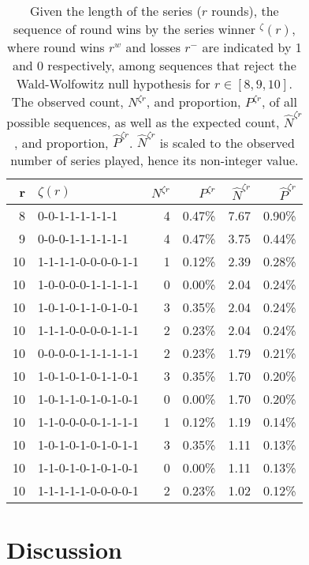 \documentclass{article}
\begin{document}
\begin{longtable}{rlrrrr}

\caption{Given the length of the series ($r$ rounds), the sequence of round wins by the series winner $^\zeta(r)$, where round wins $r^w$ and losses $r^-$ are indicated by 1 and 0 respectively, among sequences that reject the Wald-Wolfowitz null hypothesis for $r \in [8, 9, 10]$. The observed count, $N^{\zeta r}$, and proportion, $P^{\zeta r}$, of all possible sequences, as well as the expected count, $\hat{N}^{\zeta r}$, and proportion, $\hat{P}^{\zeta r}$. $\hat{N}^{\zeta r}$ is scaled to the observed number of series played, hence its non-integer value.}
\label{tbl:cod-runs} \\

\toprule
r & $\zeta(r)$ & $N^{\zeta r}$ & $P^{\zeta r}$ & $\hat{N}^{\zeta r}$ & $\hat{P}^{\zeta r}$ \\ 
\midrule
8 & 0-0-1-1-1-1-1-1 & 4 & 0.47\% & 7.67 & 0.90\% \\ 
9 & 0-0-0-1-1-1-1-1-1 & 4 & 0.47\% & 3.75 & 0.44\% \\ 
10 & 1-1-1-1-0-0-0-0-1-1 & 1 & 0.12\% & 2.39 & 0.28\% \\ 
10 & 1-0-0-0-0-1-1-1-1-1 & 0 & 0.00\% & 2.04 & 0.24\% \\ 
10 & 1-0-1-0-1-1-0-1-0-1 & 3 & 0.35\% & 2.04 & 0.24\% \\ 
10 & 1-1-1-0-0-0-0-1-1-1 & 2 & 0.23\% & 2.04 & 0.24\% \\ 
10 & 0-0-0-0-1-1-1-1-1-1 & 2 & 0.23\% & 1.79 & 0.21\% \\ 
10 & 1-0-1-0-1-0-1-1-0-1 & 3 & 0.35\% & 1.70 & 0.20\% \\ 
10 & 1-0-1-1-0-1-0-1-0-1 & 0 & 0.00\% & 1.70 & 0.20\% \\ 
10 & 1-1-0-0-0-0-1-1-1-1 & 1 & 0.12\% & 1.19 & 0.14\% \\ 
10 & 1-0-1-0-1-0-1-0-1-1 & 3 & 0.35\% & 1.11 & 0.13\% \\ 
10 & 1-1-0-1-0-1-0-1-0-1 & 0 & 0.00\% & 1.11 & 0.13\% \\ 
10 & 1-1-1-1-1-0-0-0-0-1 & 2 & 0.23\% & 1.02 & 0.12\% \\ 
\bottomrule
\end{longtable}

\hypertarget{discussion}{%
\section{Discussion}\label{discussion}}
\end{document}
